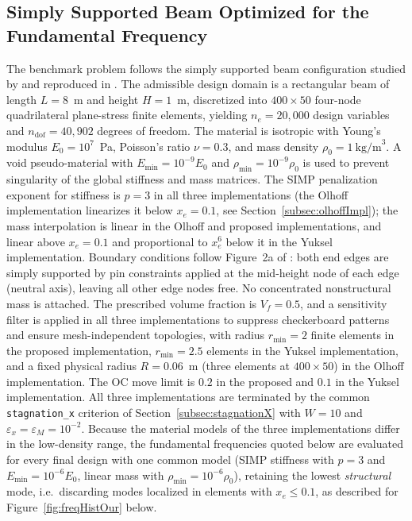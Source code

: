 \documentclass[applsci,article,submit,pdftex,moreauthors]{Definitions/mdpi}
\begin{document}
\subsection{Simply Supported Beam Optimized for the Fundamental Frequency}\label{subsec:simplySupportedBeam}
The benchmark problem follows the simply supported beam configuration studied by \citet{DU2007} and reproduced in \citet{YUKSEL2025}. The admissible design domain is a rectangular beam of length $L = 8$~m and height $H = 1$~m, discretized into $400 \times 50$ four-node quadrilateral plane-stress finite elements, yielding $n_e = 20{,}000$ design variables and $n_\mathrm{dof} = 40{,}902$ degrees of freedom. The material is isotropic with Young's modulus $E_0 = 10^7$~Pa, Poisson's ratio $\nu = 0.3$, and mass density $\rho_0 = 1~\mathrm{kg/m}^3$. A void pseudo-material with $E_\mathrm{min} = 10^{-9}E_0$ and $\rho_\mathrm{min} = 10^{-9}\rho_0$ is used to prevent singularity of the global stiffness and mass matrices. The SIMP penalization exponent for stiffness is $p = 3$ in all three implementations (the Olhoff implementation linearizes it below $x_e = 0.1$, see Section~\ref{subsec:olhoffImpl}); the mass interpolation is linear in the Olhoff and proposed implementations, and linear above $x_e = 0.1$ and proportional to $x_e^6$ below it in the Yuksel implementation. Boundary conditions follow Figure~2a of \citet{DU2007}: both end edges are simply supported by pin constraints applied at the mid-height node of each edge (neutral axis), leaving all other edge nodes free. No concentrated nonstructural mass is attached. The prescribed volume fraction is $V_f = 0.5$, and a sensitivity filter is applied in all three implementations to suppress checkerboard patterns and ensure mesh-independent topologies, with radius $r_\mathrm{min} = 2$ finite elements in the proposed implementation, $r_\mathrm{min} = 2.5$ elements in the Yuksel implementation, and a fixed physical radius $R = 0.06$~m (three elements at $400\times50$) in the Olhoff implementation. The OC move limit is $0.2$ in the proposed and $0.1$ in the Yuksel implementation. All three implementations are terminated by the common \texttt{stagnation\_x} criterion of Section~\ref{subsec:stagnationX} with $W = 10$ and $\varepsilon_x = \varepsilon_M = 10^{-2}$. Because the material models of the three implementations differ in the low-density range, the fundamental frequencies quoted below are evaluated for every final design with one common model (SIMP stiffness with $p = 3$ and $E_\mathrm{min} = 10^{-6}E_0$, linear mass with $\rho_\mathrm{min} = 10^{-6}\rho_0$), retaining the lowest \emph{structural} mode, i.e.\ discarding modes localized in elements with $x_e \le 0.1$, as described for Figure~\ref{fig:freqHistOur} below.
\end{document}
